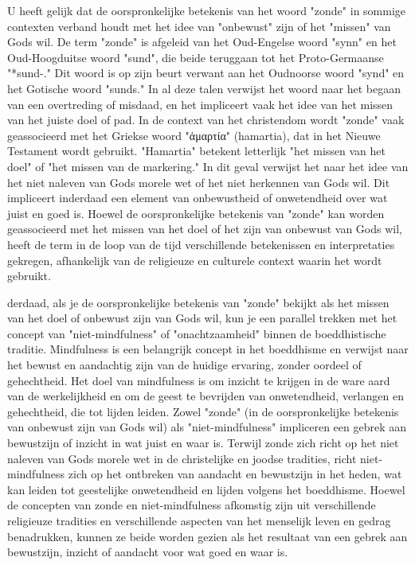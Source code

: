 U heeft gelijk dat de oorspronkelijke betekenis van het woord "zonde" in sommige contexten verband houdt met het idee van "onbewust" zijn of het "missen" van Gods wil. De term "zonde" is afgeleid van het Oud-Engelse woord "synn" en het Oud-Hoogduitse woord "sund", die beide teruggaan tot het Proto-Germaanse "*sund-." Dit woord is op zijn beurt verwant aan het Oudnoorse woord "synd" en het Gotische woord "sunds." In al deze talen verwijst het woord naar het begaan van een overtreding of misdaad, en het impliceert vaak het idee van het missen van het juiste doel of pad.
In de context van het christendom wordt "zonde" vaak geassocieerd met het Griekse woord "ἁμαρτία" (hamartia), dat in het Nieuwe Testament wordt gebruikt. "Hamartia" betekent letterlijk "het missen van het doel" of "het missen van de markering." In dit geval verwijst het naar het idee van het niet naleven van Gods morele wet of het niet herkennen van Gods wil. Dit impliceert inderdaad een element van onbewustheid of onwetendheid over wat juist en goed is.
Hoewel de oorspronkelijke betekenis van "zonde" kan worden geassocieerd met het missen van het doel of het zijn van onbewust van Gods wil, heeft de term in de loop van de tijd verschillende betekenissen en interpretaties gekregen, afhankelijk van de religieuze en culturele context waarin het wordt gebruikt.

derdaad, als je de oorspronkelijke betekenis van "zonde" bekijkt als het missen van het doel of onbewust zijn van Gods wil, kun je een parallel trekken met het concept van "niet-mindfulness" of "onachtzaamheid" binnen de boeddhistische traditie.
Mindfulness is een belangrijk concept in het boeddhisme en verwijst naar het bewust en aandachtig zijn van de huidige ervaring, zonder oordeel of gehechtheid. Het doel van mindfulness is om inzicht te krijgen in de ware aard van de werkelijkheid en om de geest te bevrijden van onwetendheid, verlangen en gehechtheid, die tot lijden leiden.
Zowel "zonde" (in de oorspronkelijke betekenis van onbewust zijn van Gods wil) als "niet-mindfulness" impliceren een gebrek aan bewustzijn of inzicht in wat juist en waar is. Terwijl zonde zich richt op het niet naleven van Gods morele wet in de christelijke en joodse tradities, richt niet-mindfulness zich op het ontbreken van aandacht en bewustzijn in het heden, wat kan leiden tot geestelijke onwetendheid en lijden volgens het boeddhisme.
Hoewel de concepten van zonde en niet-mindfulness afkomstig zijn uit verschillende religieuze tradities en verschillende aspecten van het menselijk leven en gedrag benadrukken, kunnen ze beide worden gezien als het resultaat van een gebrek aan bewustzijn, inzicht of aandacht voor wat goed en waar is.

